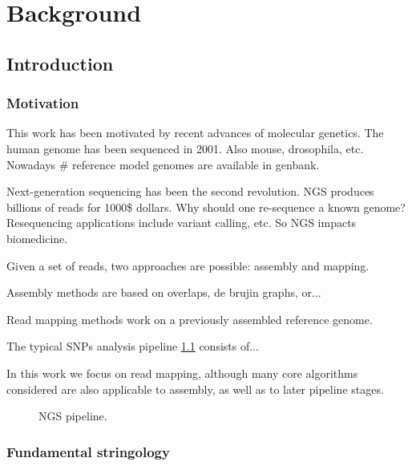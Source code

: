 \chapter{Background}


\section{Introduction}


\subsection{Motivation}

This work has been motivated by recent advances of molecular genetics.
The human genome has been sequenced in 2001. Also mouse, drosophila, etc.
Nowadays \# reference model genomes are available in genbank.

Next-generation sequencing has been the second revolution.
NGS produces billions of reads for 1000\$ dollars.
Why should one re-sequence a known genome?
Resequencing applications include variant calling, etc.
So NGS impacts biomedicine.

Given a set of reads, two approaches are possible: assembly and mapping.

Assembly methods are based on overlaps, de brujin graphs, or...

Read mapping methods work on a previously assembled reference genome.

The typical SNPs analysis pipeline \ref{fig:ngs-pipeline} consists of...

In this work we focus on read mapping, although many core algorithms considered are also applicable to assembly, as well as to later pipeline stages.

\begin{figure}[h]
\caption{NGS pipeline.}
\label{fig:ngs-pipeline}
\end{figure}


\subsection{Fundamental stringology}

